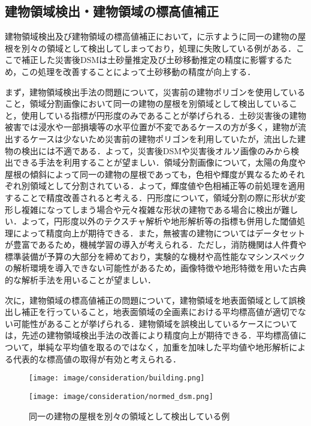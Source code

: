     \subsection*{建物領域検出・建物領域の標高値補正}
      建物領域検出及び建物領域の標高値補正において，に示すように同一の建物の屋根を別々の領域として検出してしまっており，処理に失敗している例がある．ここで補正した災害後DSMは土砂量推定及び土砂移動推定の精度に影響するため，この処理を改善することによって土砂移動の精度が向上する．
      
      まず，建物領域検出手法の問題について，災害前の建物ポリゴンを使用していること，領域分割画像において同一の建物の屋根を別領域として検出していること，使用している指標が円形度のみであることが挙げられる．土砂災害後の建物被害では浸水や一部損壊等の水平位置が不変であるケースの方が多く，建物が流出するケースは少ないため災害前の建物ポリゴンを利用していたが，流出した建物の検出には不適である．よって，災害後DSMや災害後オルソ画像のみから検出できる手法を利用することが望ましい．領域分割画像について，太陽の角度や屋根の傾斜によって同一の建物の屋根であっても，色相や輝度が異なるためそれぞれ別領域として分割されている．よって，輝度値や色相補正等の前処理を適用することで精度改善されると考える．円形度について，領域分割の際に形状が変形し複雑になってしまう場合や元々複雑な形状の建物である場合に検出が難しい．よって，円形度以外のテクスチャ解析や地形解析等の指標も併用した閾値処理によって精度向上が期待できる．また，無被害の建物についてはデータセットが豊富であるため，機械学習の導入が考えられる．ただし，消防機関は人件費や標準装備が予算の大部分を締めており，実験的な機材や高性能なマシンスペックの解析環境を導入できない可能性があるため，画像特徴や地形特徴を用いた古典的な解析手法を用いることが望ましい\cite{消防白書}．

      次に，建物領域の標高値補正の問題について，建物領域を地表面領域として誤検出し補正を行っていること，地表面領域の全画素における平均標高値が適切でない可能性があることが挙げられる．建物領域を誤検出しているケースについては，先述の建物領域検出手法の改善により精度向上が期待できる．平均標高値について，単純な平均値を取るのではなく，加重を加味した平均値や地形解析による代表的な標高値の取得が有効と考えられる．

      \begin{figure}[tbp]
        \begin{minipage}[c]{0.5\hsize}
          \centering
          \texttt{[image: image/consideration/building.png]}
        \end{minipage}
        \begin{minipage}[c]{0.5\hsize}
          \centering
          \texttt{[image: image/consideration/normed\_dsm.png]}
        \end{minipage}
        \caption{同一の建物の屋根を別々の領域として検出している例}
        \label{建物領域低精度例}
      \end{figure}      


